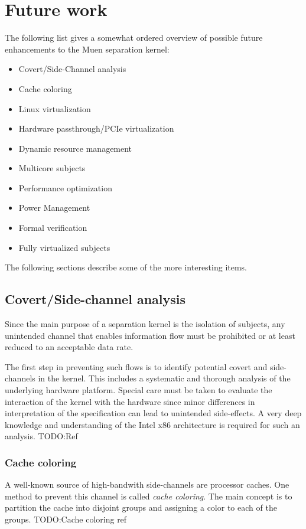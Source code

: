 \section{Future work}

The following list gives a somewhat ordered overview of possible future
enhancements to the Muen separation kernel:

\begin{itemize}
	\item Covert/Side-Channel analysis
	\item Cache coloring
	\item Linux virtualization
	\item Hardware passthrough/PCIe virtualization
	\item Dynamic resource management
	\item Multicore subjects
	\item Performance optimization
	\item Power Management
	\item Formal verification
	\item Fully virtualized subjects
\end{itemize}

The following sections describe some of the more interesting items.

\subsection{Covert/Side-channel analysis}
Since the main purpose of a separation kernel is the isolation of subjects, any
unintended channel that enables information flow must be prohibited or at least
reduced to an acceptable data rate.

The first step in preventing such flows is to identify potential covert and
side-channels in the kernel. This includes a systematic and thorough analysis of
the underlying hardware platform. Special care must be taken to evaluate the
interaction of the kernel with the hardware since minor differences in
interpretation of the specification can lead to unintended side-effects. A very
deep knowledge and understanding of the Intel x86 architecture is required for
such an analysis.
TODO:Ref

\subsubsection{Cache coloring}
A well-known source of high-bandwith side-channels are processor caches. One
method to prevent this channel is called \emph{cache coloring}. The main concept
is to partition the cache into disjoint groups and assigning a color to each of
the groups. TODO:Cache coloring ref

